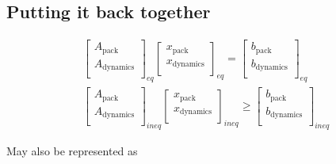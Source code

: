 \documentclass[letterpaper, 10pt, conference]{IEEEtran}
\begin{document}
\subsection{Putting it back together}\label{putting-it-back-together}

\begin{equation*}
\begin{array}{c}
    \begin{bmatrix}
        A_{\textrm{pack}}     \\
        A_{\textrm{dynamics}} \\
    \end{bmatrix}_{eq}
    \begin{bmatrix}
        x_{\textrm{pack}}     \\
        x_{\textrm{dynamics}} \\
    \end{bmatrix}_{eq} =
    \begin{bmatrix}
        b_{\textrm{pack}}     \\
        b_{\textrm{dynamics}} \\
    \end{bmatrix}_{eq} \\
    \begin{bmatrix}
        A_{\textrm{pack}}     \\
        A_{\textrm{dynamics}} \\
    \end{bmatrix}_{ineq}
    \begin{bmatrix}
        x_{\textrm{pack}}     \\
        x_{\textrm{dynamics}} \\
    \end{bmatrix}_{ineq} \geq
    \begin{bmatrix}
        b_{\textrm{pack}}     \\
        b_{\textrm{dynamics}} \\
    \end{bmatrix}_{ineq}
\end{array}
\end{equation*}

May also be represented as

\scriptsize
\end{document}
